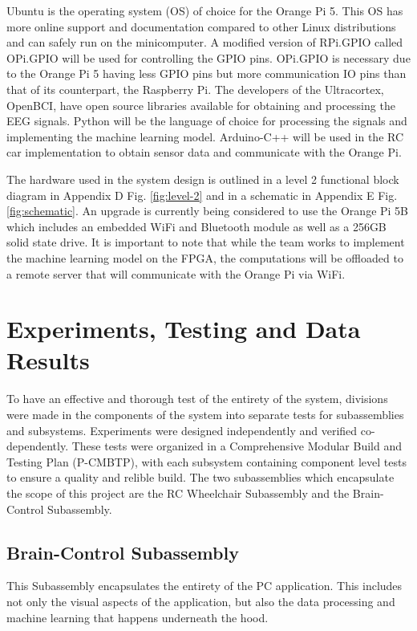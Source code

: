 \documentclass[conference]{IEEEtran}
\begin{document}
    Ubuntu is the operating system (OS) of choice for the Orange Pi 5. This OS has more online support and documentation compared to other Linux distributions and can safely run on the minicomputer. A modified version of RPi.GPIO called OPi.GPIO will be used for controlling the GPIO pins. OPi.GPIO is necessary due to the Orange Pi 5 having less GPIO pins but more communication IO pins than that of its counterpart, the Raspberry Pi. The developers of the Ultracortex, OpenBCI, have open source libraries available for obtaining and processing the EEG signals. Python will be the language of choice for processing the signals and implementing the machine learning model. Arduino-C++ will be used in the RC car implementation to obtain sensor data and communicate with the Orange Pi. 

    The hardware used in the system design is outlined in a level 2 functional block diagram in Appendix D Fig. \ref{fig:level-2} and in a schematic in Appendix E Fig. \ref{fig:schematic}. An upgrade is currently being considered to use the Orange Pi 5B which includes an embedded WiFi and Bluetooth module as well as a 256GB solid state drive. It is important to note that while the team works to implement the machine learning model on the FPGA, the computations will be offloaded to a remote server that will communicate with the Orange Pi via WiFi. 

\section{Experiments, Testing and Data Results}
To have an effective and thorough test of the entirety of the system, divisions were made in the components of the system into separate tests for subassemblies and subsystems. Experiments were designed independently and verified co-dependently. These tests were organized in a Comprehensive Modular Build and Testing Plan (P-CMBTP), with each subsystem containing component level tests to ensure a quality and relible build. The two subassemblies which encapsulate the scope of this project are the RC Wheelchair Subassembly and the Brain-Control Subassembly. 
    
    \subsection{Brain-Control Subassembly}
    This Subassembly encapsulates the entirety of the PC application. This includes not only the visual aspects of the application, but also the data processing and machine learning that happens underneath the hood. 
\end{document}
